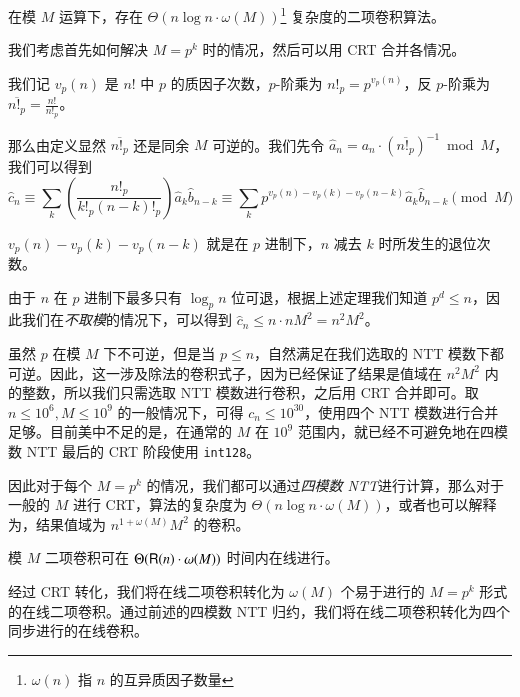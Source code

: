 \begin{theorem}
在模 $M$ 运算下，存在 $\Theta(n\log n \cdot \omega(M))$\footnote{$\omega(n)$ 指 $n$ 的互异质因子数量} 复杂度的二项卷积算法。
\end{theorem}

我们考虑首先如何解决 $M = p^k$ 时的情况，然后可以用 CRT 合并各情况。

我们记 $v_p(n)$ 是 $n!$ 中 $p$ 的质因子次数，$p$-阶乘为 $n!_p = p^{v_p(n)}$，反 $p$-阶乘为 $\overline{n!_p} = \frac{n!}{n!_p}$。

那么由定义显然 $\overline{n!_p}$ 还是同余 $M$ 可逆的。我们先令 $\widehat a_n = a_n \cdot \left( \overline{n!_p} \right)^{-1} \bmod M$，我们可以得到
$$
\widehat c_n \equiv \sum_k \left(\frac{n!_p}{k!_p (n-k)!_p}\right) \widehat a_k \widehat b_{n-k} \equiv \sum_k p^{v_p(n)-v_p(k)-v_p(n-k)} \widehat a_k \widehat b_{n-k} \pmod M
$$

\begin{theorem}[Kummer]

$v_p(n)-v_p(k)-v_p(n-k)$ 就是在 $p$ 进制下，$n$ 减去 $k$ 时所发生的退位次数。

\end{theorem}

由于 $n$ 在 $p$ 进制下最多只有 $\log_p n$ 位可退，根据上述定理我们知道 $p^d \le n$，因此我们在\emph{不取模}的情况下，可以得到 $\widehat c_n \le n \cdot nM^2 = n^2M^2$。

虽然 $p$ 在模 $M$ 下不可逆，但是当 $p\le n$，自然满足在我们选取的 NTT 模数下都可逆。因此，这一涉及除法的卷积式子，因为已经保证了结果是值域在 $n^2M^2$ 内的整数，所以我们只需选取 NTT 模数进行卷积，之后用 CRT 合并即可。取 $n\le 10^6, M\le 10^9$ 的一般情况下，可得 $c_n \le 10^{30}$，使用四个 NTT 模数进行合并足够。目前美中不足的是，在通常的 $M$ 在 $10^9$ 范围内，就已经不可避免地在四模数 NTT 最后的 CRT 阶段使用 \texttt{int128}。

因此对于每个 $M=p^k$ 的情况，我们都可以通过\emph{四模数 NTT}进行计算，那么对于一般的 $M$ 进行 CRT，算法的复杂度为 $\Theta(n\log n \cdot \omega(M))$，或者也可以解释为，结果值域为 $n^{1+\omega(M)}M^2$ 的卷积。

\begin{theorem}
模 $M$ 二项卷积可在 $\Theta(\mathsf R(n)\cdot \omega(M))$ 时间内在线进行。
\end{theorem}

经过 CRT 转化，我们将在线二项卷积转化为 $\omega(M)$ 个易于进行的 $M=p^k$ 形式的在线二项卷积。通过前述的四模数 NTT 归约，我们将在线二项卷积转化为四个同步进行的在线卷积。

